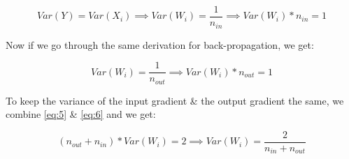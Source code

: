 \documentclass[12pt]{article}
\begin{document}
\begin{center}
	\begin{equation}
	 Var(Y) = Var(X_i) \implies Var(W_i) = \frac{1}{n_{in}} \implies Var(W_i) * n_{in} = 1  \label{eq:5}
	\end{equation}
\end{center}
Now if we go through the same derivation for back-propagation, we get:
\begin{center}
	\begin{equation}
	Var(W_i) = \frac{1}{n_{out}} \implies Var(W_i) * n_{out} = 1 \label{eq:6}
	\end{equation}
\end{center}
To keep the variance of the input gradient \& the output gradient the same, we combine
\eqref{eq:5} \& \eqref{eq:6} and we get:
\begin{center}
	\begin{equation}
	(n_{out} + n_{in}) * Var(W_i) = 2 \implies Var(W_i) = \frac{2}{n_{in} + n_{out}} \label{eq:7}
	\end{equation}
\end{center}
\newpage
\end{document}
